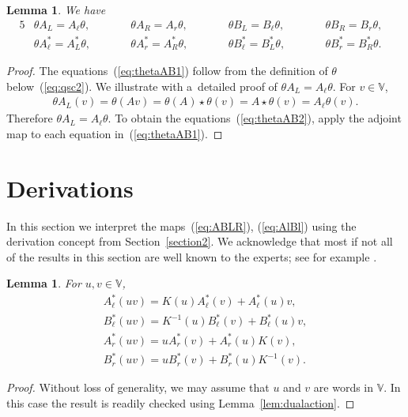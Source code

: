 \documentclass[pdftex]{sigma}
\numberwithin{equation}{section}
\newtheorem{Lemma}[Theorem]{Lemma}
\begin{document}
\begin{Lemma}\label{lem:thetaAB}We have
\begin{alignat}{5}
&\theta A_L = A_\ell \theta,
\qquad &&
\theta A_R = A_r \theta,
\qquad &&
\theta B_L = B_\ell \theta,
\qquad &&
\theta B_R = B_r \theta,&
\label{eq:thetaAB1}
\\
& \theta A^*_\ell = A^*_L \theta,
\qquad &&
\theta A^*_r = A^*_R \theta,
\qquad &&
\theta B^*_\ell = B^*_L \theta,
\qquad &&
\theta B^*_r = B^*_R \theta.&\label{eq:thetaAB2}
\end{alignat}
\end{Lemma}
\begin{proof} The equations~(\ref{eq:thetaAB1}) follow from the definition of $\theta$ below~(\ref{eq:qsc2}). We illustrate with a~detailed proof of $\theta A_L = A_\ell \theta$. For $v \in \mathbb V$,
\begin{gather*}
\theta A_L (v) =
\theta(Av) =
\theta(A) \star \theta(v) =
A \star \theta(v)=
A_\ell \theta (v).
\end{gather*}
Therefore $\theta A_L = A_\ell \theta$. To obtain the equations~(\ref{eq:thetaAB2}), apply the adjoint map to each equation in~(\ref{eq:thetaAB1}).
\end{proof}

\section{Derivations}\label{section8}

In this section we interpret the maps~(\ref{eq:ABLR}),
(\ref{eq:AlBl})
using the derivation concept from
 Section~\ref{section2}. We acknowledge that most if not all of the results in
 this section are well known to the experts; see for example
 \cite[Sections~3 and~4]{green}.

\begin{Lemma}\label{lem:derAs}
For $u,v \in \mathbb V$,
\begin{gather*}
A^*_\ell (uv) =
K(u) A^*_\ell (v)
+A^*_\ell (u)v,
\\
B^*_\ell (uv) =
K^{-1}(u) B^*_\ell (v)+
B^*_\ell (u)v,
\\
A^*_r (uv) =
u A^*_r (v)+
A^*_r (u) K(v),
\\
B^*_r (uv) =
u B^*_r (v)+
B^*_r (u) K^{-1}(v).
\end{gather*}
\end{Lemma}
\begin{proof}Without loss of generality, we may assume that $u$ and $v$ are words in
$\mathbb V$. In this case the result is readily checked using
Lemma~\ref{lem:dualaction}.
\end{proof}
\end{document}
